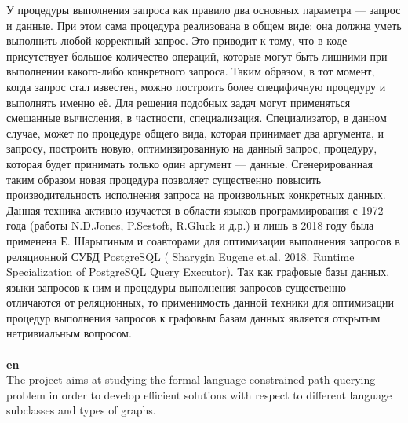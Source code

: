 \documentclass[12pt]{article}  %
\theoremstyle{remark}
\begin{document}
У процедуры выполнения запроса как правило два основных параметра --- запрос и данные.
При этом сама процедура реализована в общем виде: она должна уметь выполнить любой корректный запрос.
Это приводит к тому, что в коде присутствует большое количество операций, которые могут быть лишними при выполнении какого-либо конкретного запроса.
Таким образом, в тот момент, когда запрос стал известен, можно построить более специфичную процедуру и выполнять именно её.
Для решения подобных задач могут применяться смешанные вычисления, в частности, специализация.
Специализатор, в данном случае, может по процедуре общего вида, которая принимает два аргумента, и запросу, построить новую, оптимизированную на данный запрос, процедуру, которая будет принимать только один аргумент --- данные. Сгенерированная таким образом новая процедура позволяет существенно повысить производительность исполнения запроса на произвольных конкретных данных.
Данная техника активно изучается в области языков программирования с 1972 года (работы N.D.Jones, P.Sestoft, R.Gluck и д.р.) и лишь в 2018 году была применена Е. Шарыгиным и соавторами для оптимизации выполнения запросов в реляционной СУБД PostgreSQL ( Sharygin Eugene et.al. 2018. Runtime Specialization of PostgreSQL Query Executor). Так как графовые базы данных, языки запросов к ним и процедуры выполнения запросов существенно отличаются от реляционных, то применимость данной техники для оптимизации процедур выполнения запросов к графовым базам данных является открытым нетривиальным вопросом.
\\
\\
\textbf{en}\\


The project aims at studying the formal language constrained path querying problem in order to develop efficient solutions with respect to different language subclasses and types of graphs.
\end{document}
